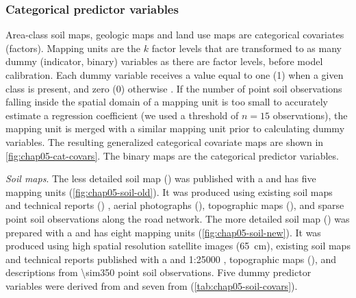 \subsubsection*{Categorical predictor variables}
\label{subsubsec:chap05-categorical-covars}

Area-class soil maps, geologic maps and land use maps are categorical covariates (factors). Mapping units are 
the $k$ factor levels that are transformed to as many dummy (indicator, binary) variables as there are factor 
levels, before model calibration. Each dummy variable receives a value equal to one (\num{1}) when a given 
class is present, and zero (\num{0}) otherwise \cite{Everitt2006}. If the number of point soil observations 
falling inside the spatial domain of a mapping unit is too small to accurately estimate a regression 
coefficient (we used a threshold of $n = 15$ observations), the mapping unit is merged with a similar mapping 
unit prior to calculating dummy variables. The resulting generalized categorical covariate maps are shown in 
\autoref{fig:chap05-cat-covars}. The binary maps are the categorical predictor variables.

\noindent\textit{Soil maps}. The less detailed soil map (\soilOld) was published with a  and 
has five mapping units \cite{AzolinEtAl1988} (\autoref{fig:chap05-soil-old}). It was produced using existing 
soil maps and technical reports () \cite{Brasil1973}, aerial photographs (), 
topographic maps (), and sparse point soil observations along the road network. The more detailed 
soil map (\soilNew) was prepared with a  and has eight mapping units \cite{MiguelEtAl2012} 
(\autoref{fig:chap05-soil-new}). It was produced using high spatial resolution satellite images 
(\SI{65}{\cm}), existing soil maps and technical reports published with a  \cite{Poelking2007} 
and \num{1}:\num{25000} \cite{PedronEtAl2006b}, topographic maps (), and descriptions from 
\num{\sim350} point soil observations. Five dummy predictor variables were derived from \soilOld{} and seven 
from \soilNew{} (\autoref{tab:chap05-soil-covars}).


